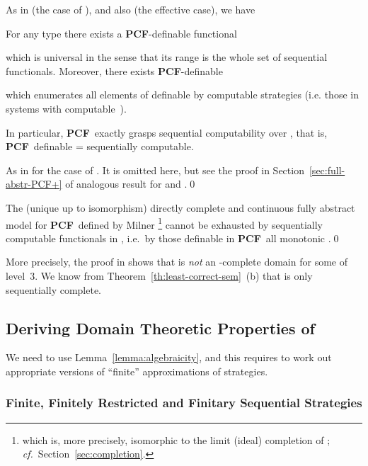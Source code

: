 \documentclass[fleqn]{LMCS}
\theoremstyle{plain}\newtheorem{satz}[thm]{Satz}
\theoremstyle{plain}\newtheorem{hyp}[thm]{Hypothesis}
\theoremstyle{plain}\newtheorem{hyps}[thm]{Hypotheses}
\theoremstyle{definition}\newtheorem{note}[thm]{Note}
\def\cf{{\em cf.}}
\newcommand{\PCF}{\mbox{\bf PCF}}
\newcommand{\?}{\mbox{?}}
\begin{document}
\noindent
As in \cite{Saz76AL} (the case of ), 
\cite{Abramsky-Jagadeesan2000,Hyland-Ong2000} 
and also \cite{Longley-Plotkin} (the effective case), we have
\begin{thm}\label{th:universal}
For any type  there exists a\/ \PCF-definable functional

which is universal in the
sense that its range is the whole set  of sequential 
functionals. Moreover, there
exists\/ \PCF-definable

which enumerates all elements of  definable by
computable strategies (i.e. those in systems 
with computable~).

In particular,\/ \PCF\ exactly grasps sequential computability over , 
that is, \PCF\ definable = sequentially computable. 
\end{thm}
\proof  As in \cite{Saz76AL} for the case of 
. It is omitted here, but see the proof 
in Section~\ref{sec:full-abstr-PCF+} 
of analogous result for  and .\qed










\begin{thm}
\label{th:normann}
The (unique up to isomorphism) directly complete and continuous 
fully abstract model 
for \PCF\ defined by Milner {\em \cite{Milner77}}\footnote{which is, more precisely, isomorphic to the limit (ideal) completion  
of ; 
\cf\ Section~\ref{sec:completion}. 
}
cannot be exhausted by sequentially computable functionals 
in , 
i.e.\ by those definable in \PCF\  all monotonic .\qed
\end{thm}

\noindent
More precisely, the proof in \cite{Normann2004} shows that 
 is \emph{not} an -complete domain for some  
of level~3. 
We know from Theorem~\ref{th:least-correct-sem}~(b) that  
is only sequentially complete.


\subsection{Deriving Domain Theoretic Properties 
of \texorpdfstring{}{Q}}

We need to use Lemma~\ref{lemma:algebraicity}, and this requires 
to work out appropriate versions 
of ``finite'' approximations of strategies. 

\subsubsection{Finite, Finitely Restricted and Finitary Sequential Strategies}
\label{sec:ranked-finitary}
\end{document}
